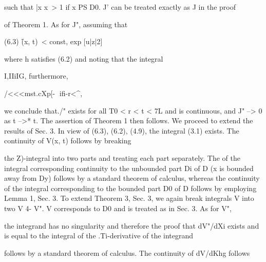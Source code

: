 \begin{ocrformula}
such that |x    x\ > 1 if x PS D0. J' can be treated exactly                                as J in the proof
\end{ocrformula}

of Theorem 1. As for J", assuming that

\begin{ocrformula}
(6.3)                                \f(x, t)\ < const, exp [u|z|2]
\end{ocrformula}

where h satisfies (6.2) and noting that the integral

\begin{ocrformula}
is convergent        for all 7',,< t <        t <    I\ if l{*>is sufficiently close to l0, and
\end{ocrformula}

I,IIiIG, furthermore,

\begin{ocrformula}
/<<<mst.cXp[-^^]                                ifi-r<^,
\end{ocrformula}

\begin{ocrformula}
we conclude that./" exists for all T0 < r < t < 7L and is continuous,                                        and
J" --> 0 as t -->* t. The assertion of Theorem 1 then follows.
We  proceed   to extend the results of Sec. 3. In view of (6.3), (6.2),
(4.9), the integral (3.1) exists. The continuity of V(x, t) follows by breaking
\end{ocrformula}

the Z)-integral into two parts and treating each part separately. The of the integral corresponding continuity to the unbounded part Di of D (x is bounded away from Dy) follows by a standard theorem of calculus, whereas the continuity of the integral corresponding to the bounded part D0 of D follows by employing Lemma 1, Sec. 3. To extend Theorem 3, Sec. 3, we again break integrals V into two V 4- V". V corresponds to D0 and is treated as in Sec. 3. As for V",

\begin{ocrformula}
the integrand  has no singularity and therefore the proof that dV"/dXi
exists and is equal to the integral of the .Ti-derivative of the integrand
\end{ocrformula}

follows by a standard theorem of calculus. The continuity of dV/dKhg follows

